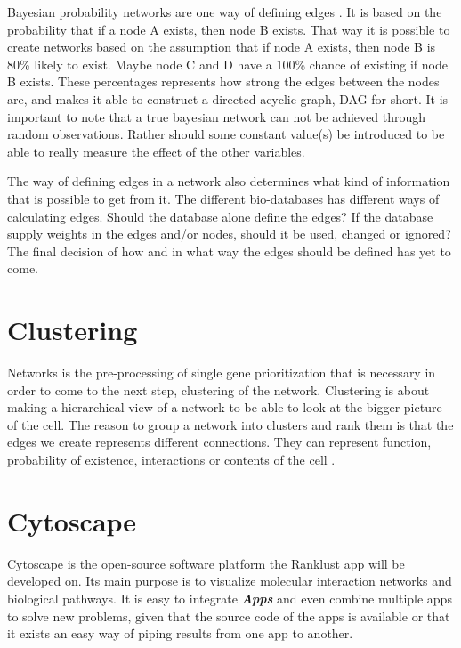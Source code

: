 \documentclass[UKenglish,11pt,a4paper]{article}
\begin{document}
Bayesian probability networks are one way of defining edges \cite{bayesiannetworks}. It is based on the probability that
if a node A exists, then node B exists. That way it is possible to create networks based on the assumption that if node
A exists, then node B is 80\% likely to exist. Maybe node C and D have a 100\% chance of existing if node B exists.
These percentages represents how strong the edges between the nodes are, and makes it able to construct a directed
acyclic graph, DAG for short. It is important to note that a true bayesian network can not be achieved through random 
observations. Rather should some constant value(s) be introduced to be able to really measure the effect of the other
variables.

The way of defining edges in a network also determines what kind of information that is possible to get from it. The
different bio-databases has different ways of calculating edges. Should the database alone define the edges? If the
database supply weights in the edges and/or nodes, should it be used, changed or ignored? The final decision of how and
in what way the edges should be defined has yet to come. 
\section{Clustering}
Networks is the pre-processing of single gene prioritization that is necessary in order to come to the next step,
clustering of the network. Clustering is about making a hierarchical view of a network to be able to look at the bigger
picture of the cell. The reason to group a network into clusters and rank them is that the edges we create represents
different connections. They can represent function, probability of existence, interactions or contents of the cell
\cite{siri}. %
\section{Cytoscape}
Cytoscape is the open-source software platform the Ranklust app will be developed on. Its main purpose is to visualize
molecular interaction networks and biological pathways.  It is easy to integrate \textbf{\textit{Apps}} and even combine 
multiple apps to solve new problems, given that the source code of the apps is available or that it exists an easy way of 
piping results from one app to another. 
\end{document}
